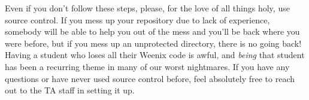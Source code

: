 Even if you don't follow these steps, please, for the love of all things holy, use source control. If you mess up your repository due to lack of experience, somebody will be able to help you out of the mess and you'll be back where you were before, but if you mess up an unprotected directory, there is no going back! Having a student who loses all their Weenix code is awful, and \emph{being} that student has been a recurring theme in many of our worst nightmares. If you have any questions or have never used source control before, feel absolutely free to reach out to the TA staff in setting it up.
 
